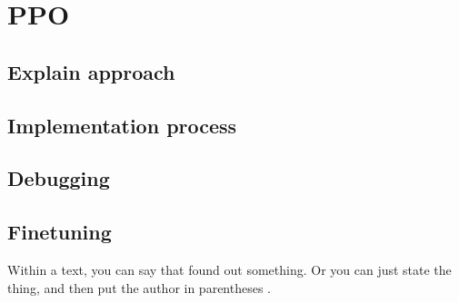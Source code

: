 \section{PPO}

\subsection{Explain approach}

\subsection{Implementation process}

\subsection{Debugging}

\subsection{Finetuning}

Within a text, you can say that \citet{lin2001} found out something. Or you can just state the thing, and then put the author in parentheses \citep[see][]{szpektor2004}.

